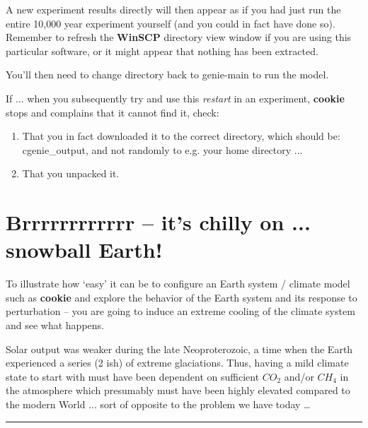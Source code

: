 A new experiment results directly will then appear as if you had just run the entire 10,000 year experiment yourself (and you could in fact have done so). Remember to refresh the \textbf{WinSCP} directory view window if you are using this particular software, or it might appear that nothing has been extracted.

\vspace{1mm}
You’ll then need to change directory back to \textsf{\footnotesize genie-main} to run the model.

\vspace{1mm}
If ... when you subsequently try and use this \textit{restart} in an experiment, \textbf{cookie} stops and complains that it cannot find it, check:
\begin{enumerate}[noitemsep]
\item That you in fact downloaded it to the correct directory, which should be: \textsf{\footnotesize cgenie\_output}, and not randomly to e.g. your home directory ...
\item That you unpacked it.
\end{enumerate}

\newpage

\section{Brrrrrrrrrrrr – it’s chilly on ... snowball Earth!}

To illustrate how ‘easy’ it can be to configure an Earth system / climate model such as \textbf{cookie} and explore the behavior of the Earth system and its response to perturbation – you are going to induce an extreme cooling of the climate system and see what happens. 

Solar output was weaker during the late Neoproterozoic, a time when the Earth experienced a series (2 ish) of extreme glaciations. Thus, having a mild climate state to start with must have been dependent on sufficient \(CO_{2}\) and/or \(CH_{4}\) in the atmosphere which presumably must have been highly elevated compared to the modern World ... sort of opposite to the problem we have today …

\vspace{1mm}\noindent\rule{4cm}{0.5pt}\vspace{2mm}

